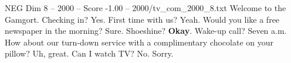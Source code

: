 \begin{textsample}{NEG Dim 8 – 2000 – Score -1.00 – 2000/tv\_com\_2000\_8.txt}  \label{ex:f8_neg_067}
Welcome to the Gamgort.
Checking in?
Yes.
First time with us?
Yeah.
Would you like a free newspaper in the morning?
Sure.
Shoeshine? \textbf{Okay}.
Wake-up call?
Seven a.m.
How about our turn-down service with a complimentary chocolate on your pillow?
Uh, great.
Can I watch TV?
No.
Sorry.

\end{textsample}

